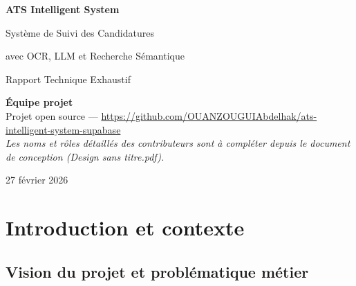 \documentclass[11pt,a4paper]{report}
\begin{document}
\begin{titlepage}
  \centering
  \vspace*{2cm}
  {\Huge\bfseries\color{primarydark} ATS Intelligent System\par}
  \vspace{0.5cm}
  {\LARGE Système de Suivi des Candidatures\par}
  {\LARGE avec OCR, LLM et Recherche Sémantique\par}
  \vspace{2cm}
  {\large Rapport Technique Exhaustif\par}
  \vspace{2cm}
  \begin{tcolorbox}[colback=lightgray,colframe=primaryblue,width=0.85\textwidth,arc=4pt]
    \textbf{Équipe projet}\\[0.5em]
    Projet open source — \url{https://github.com/OUANZOUGUIAbdelhak/ats-intelligent-system-supabase}\\[0.3em]
    \textit{Les noms et rôles détaillés des contributeurs sont à compléter depuis le document de conception (Design sans titre.pdf).}
  \end{tcolorbox}
  \vfill
  {\large 27 février 2026\par}
  \vspace{1cm}
\end{titlepage}

\tableofcontents
\newpage
\lstlistoflistings
{}
\listoftables
{}
\newpage

\chapter{Introduction et contexte}

\section{Vision du projet et problématique métier}
\end{document}
